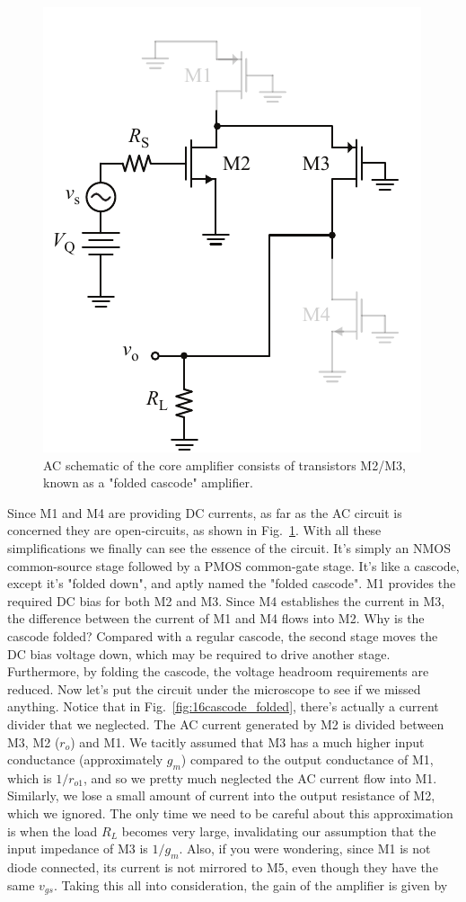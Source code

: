 \begin{figure}[tb]
\centering
\includegraphics[scale=1]{19cascode_folded_ac}
\caption{AC schematic of the core amplifier consists of transistors M2/M3, known as a "folded cascode" amplifier.}
\label{fig:19cascode_folded_ac}
\end{figure}
Since M1 and M4 are providing DC currents, as far as the AC circuit is concerned they are open-circuits, as shown in Fig.~\ref{fig:19cascode_folded_ac}.  With all these simplifications we finally can see the essence of the circuit. It's simply an NMOS common-source stage followed by a PMOS common-gate stage.  It's like a cascode, except it's "folded down", and aptly named the "folded cascode".  M1 provides the required DC bias for both M2 and M3.  Since M4 establishes the current in M3, the difference between the current of M1 and M4 flows into M2.
Why is the cascode folded?  Compared with a regular cascode, the second stage moves the DC bias voltage down, which may be required to drive another stage.  Furthermore, by folding the cascode, the voltage headroom requirements are reduced.
Now let's put the circuit under the microscope to see if we missed anything.  Notice that in Fig.~\ref{fig:16cascode_folded}, there's actually a current divider that we neglected.  The AC current generated by M2 is divided between M3, M2 ($r_o$) and M1.  We tacitly assumed that M3 has a much higher input conductance (approximately $g_m$) compared to the output conductance of M1, which is $1/r_{o1}$, and so we pretty much neglected the AC current flow into M1.  Similarly, we lose a small amount of current into the output resistance of M2, which we ignored.  The only time we need to be careful about this approximation is when the load $R_L$ becomes very large, invalidating our assumption that the input impedance of M3 is $1/g_m$.  Also, if you were wondering, since M1 is not diode connected, its current is not mirrored to M5, even though they have the same $v_{gs}$.  Taking this all into consideration, the gain of the amplifier is given by
